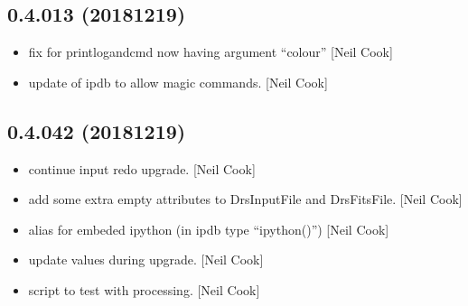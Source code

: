 \documentclass[a4paper,10pt,english]{report}
\begin{document}
\subsection{0.4.013 (2018\sphinxhyphen{}12\sphinxhyphen{}19)}
\label{\detokenize{misc/changelog:id244}}\begin{itemize}
\item {} 
 \sphinxhyphen{} fix for printlogandcmd now having argument “colour”
{[}Neil Cook{]}

\item {} 
 \sphinxhyphen{} update of ipdb to allow magic commands. {[}Neil Cook{]}

\end{itemize}


\subsection{0.4.042 (2018\sphinxhyphen{}12\sphinxhyphen{}19)}
\label{\detokenize{misc/changelog:id245}}\begin{itemize}
\item {} 
 \sphinxhyphen{} continue input redo upgrade. {[}Neil Cook{]}

\item {} 
 \sphinxhyphen{} add some extra empty attributes to DrsInputFile and
DrsFitsFile. {[}Neil Cook{]}

\item {} 
 \sphinxhyphen{} alias for embeded ipython (in ipdb type “ipython()”)
{[}Neil Cook{]}

\item {} 
 \sphinxhyphen{} update values during  upgrade. {[}Neil
Cook{]}

\item {} 
 \sphinxhyphen{} script to test  with processing. {[}Neil
Cook{]}

\end{itemize}
\end{document}
